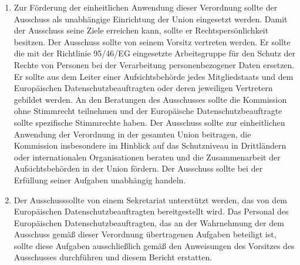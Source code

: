 \begin{enumerate}
   \item Zur Förderung der einheitlichen Anwendung dieser Verordnung sollte der Ausschuss als unabhängige Einrichtung
    der Union eingesetzt werden. Damit der Ausschuss seine Ziele erreichen kann, sollte er Rechtspersönlichkeit
    besitzen. Der Ausschuss sollte von seinem Vorsitz vertreten werden. Er sollte die mit der Richtlinie 95/46/EG
    eingesetzte Arbeitsgruppe für den Schutz der Rechte von Personen bei der Verarbeitung personenbezogener Daten
    ersetzen. Er sollte aus dem Leiter einer Aufsichtsbehörde jedes Mitgliedstaats und dem Europäischen
    Datenschutzbeauftragten oder deren jeweiligen Vertretern gebildet werden. An den Beratungen des Ausschusses sollte
    die Kommission ohne Stimmrecht teilnehmen und der Europäische Datenschutzbeauftragte sollte spezifische Stimmrechte
    haben. Der Ausschuss sollte zur einheitlichen Anwendung der Verordnung in der gesamten Union beitragen, die
    Kommission insbesondere im Hinblick auf das Schutzniveau in Drittländern oder internationalen Organisationen
    beraten und die Zusammenarbeit der Aufsichtsbehörden in der Union fördern. Der Ausschuss sollte bei der Erfüllung
    seiner Aufgaben unabhängig handeln.%
   \label{itm:eg-139}
   

   \item Der Ausschusssollte von einem Sekretariat unterstützt werden, das von dem Europäischen Datenschutzbeauftragten
    bereitgestellt wird. Das Personal des Europäischen Datenschutzbeauftragten, das an der Wahrnehmung der dem
    Ausschuss gemäß dieser Verordnung übertragenen Aufgaben beteiligt ist, sollte diese Aufgaben ausschließlich gemäß
    den Anweisungen des Vorsitzes des Ausschusses durchführen und diesem Bericht erstatten.%
   \label{itm:eg-140}
   


\end{enumerate}
